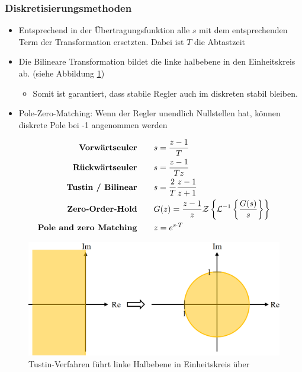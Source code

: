 \subsubsection{Diskretisierungsmethoden}
\begin{itemize}
	\item Entsprechend in der Übertragungsfunktion alle $s$ mit dem entsprechenden Term der Transformation ersetzten. Dabei ist $T$ die Abtastzeit
	\item Die Bilineare Transformation bildet die linke halbebene in den Einheitskreis ab. (siehe Abbildung \ref{fig:Tustin})
	\begin{itemize}
		\item Somit ist garantiert, dass stabile Regler auch im diskreten stabil bleiben.
	\end{itemize}
	\item Pole-Zero-Matching: Wenn der Regler unendlich Nullstellen hat, können diskrete Pole bei -1 angenommen werden
\end{itemize}
\begin{align*}
	\text{\textbf{Vorwärtseuler}} \qquad & s=\frac{z-1}{T}\\
	\text{\textbf{Rückwärtseuler}} \qquad & s=\frac{z-1}{Tz}\\
	\text{\textbf{Tustin / Bilinear}} \qquad & s=\frac{2}{T}\frac{z-1}{z+1}\\
	\text{\textbf{Zero-Order-Hold}} \qquad& G(z) = \frac{z-1}{z}\mathcal{Z}\left\{\mathcal{L}^{-1}\left\{\frac{G(s)}{s}\right\}\right\}\\
	\text{\textbf{Pole and zero Matching}} \qquad & z=e^{s\cdot T}
\end{align*}
\begin{figure}[h!]
	\centering
	\includegraphics[width=0.3\linewidth]{bilder/Tustin}
	\caption{Tustin-Verfahren führt linke Halbebene in Einheitskreis über}
	\label{fig:Tustin}
\end{figure}

